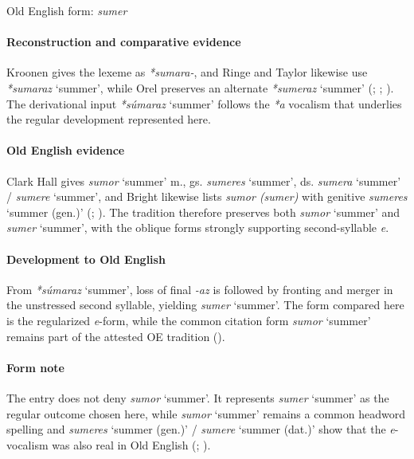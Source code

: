 \documentclass[
  british,
  a4paper,
]{article}
\providecommand{\Recon}[1]{\emph{*#1}}
\begin{document}
Old English form: \emph{sumer}

\paragraph{Reconstruction and comparative
evidence}\label{reconstruction-and-comparative-evidence-55}

Kroonen gives the lexeme as \emph{*sumara-}, and Ringe and Taylor
likewise use \Recon{sumaraz} `summer', while Orel preserves an alternate
\Recon{sumeraz} `summer' (;
;
). The derivational input
\Recon{súmaraz} `summer' follows the \emph{*a} vocalism that underlies
the regular development represented here.

\paragraph{Old English evidence}\label{old-english-evidence-55}

Clark Hall gives {\emph{sumor}} `summer' m., gs. {\emph{sumeres}}
`summer', ds. {\emph{sumera}} `summer' / {\emph{sumere}} `summer', and
Bright likewise lists \emph{sumor (sumer)} with genitive
{\emph{sumeres}} `summer (gen.)' (; ).
The tradition therefore preserves both {\emph{sumor}} `summer' and
{\emph{sumer}} `summer', with the oblique forms strongly supporting
second-syllable \emph{e}.

\paragraph{Development to Old
English}\label{development-to-old-english-55}

From \Recon{súmaraz} `summer', loss of final \emph{-az} is followed by
fronting and merger in the unstressed second syllable, yielding
{\emph{sumer}} `summer'. The form compared here is the regularized
\emph{e}-form, while the common citation form {\emph{sumor}} `summer'
remains part of the attested OE tradition
().

\paragraph{Form note}\label{form-note-21}

The entry does not deny {\emph{sumor}} `summer'. It represents
{\emph{sumer}} `summer' as the regular outcome chosen here, while
{\emph{sumor}} `summer' remains a common headword spelling and
{\emph{sumeres}} `summer (gen.)' / {\emph{sumere}} `summer (dat.)' show
that the \emph{e}-vocalism was also real in Old English
(;
).
\end{document}
